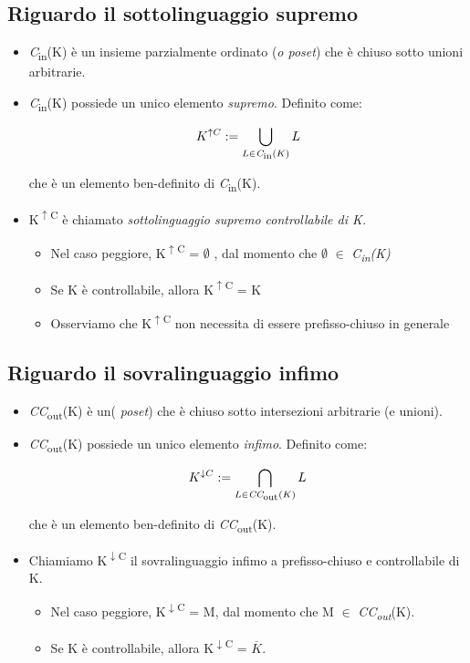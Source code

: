 \documentclass[a4paper, 11pt]{article}
\begin{document}
\subsection{Riguardo il sottolinguaggio supremo}
\begin{itemize}
\item \textit{C}\textsubscript{in}(K) è un insieme parzialmente ordinato (\textit{o poset}) che è chiuso sotto unioni arbitrarie.
\item \textit{C}\textsubscript{in}(K) possiede un unico elemento \textit{supremo}. Definito come:
\begin{center}
\[ {K}^{\uparrow C} :=   \bigcup_{L \in \textit{C}\textsubscript{in}(K)} L \]
\end{center}
che è un elemento ben-definito di \textit{C}\textsubscript{in}(K).
\item K\textsuperscript{$\uparrow$C} è chiamato \textit{sottolinguaggio supremo controllabile di K.}
\begin{itemize}
\item Nel caso peggiore, K\textsuperscript{$\uparrow$C} = $\emptyset$ , dal momento che $\emptyset$ $\in$ \textit{C\textsubscript{in}(K)}
\item Se K è controllabile, allora K\textsuperscript{$\uparrow$C} = K 
\item Osserviamo che K\textsuperscript{$\uparrow$C} non necessita di essere prefisso-chiuso in generale
\end{itemize}
\end{itemize}
\subsection{Riguardo il sovralinguaggio infimo}
\begin{itemize}
\item \textit{CC}\textsubscript{out}(K) è un(\textit{ poset}) che è chiuso sotto intersezioni arbitrarie (e unioni).
\item \textit{CC}\textsubscript{out}(K) possiede un unico elemento \textit{infimo}. Definito come:
\begin{center}
\[ {K}^{\downarrow C} :=   \bigcap_{L \in \textit{CC}\textsubscript{out}(K)} L \]
\end{center}
che è un elemento ben-definito di \textit{CC}\textsubscript{out}(K).
\item Chiamiamo K\textsuperscript{$\downarrow$C} il sovralinguaggio infimo a prefisso-chiuso e controllabile di K.
\begin{itemize}
\item Nel caso peggiore, K\textsuperscript{$\downarrow$C} = M, dal momento che M $\in$ \textit{CC\textsubscript{out}}(K).
\item Se K è controllabile, allora K\textsuperscript{$\downarrow$C} = $\overline{K}$.
\end{itemize}
\end{itemize}
\end{document}
